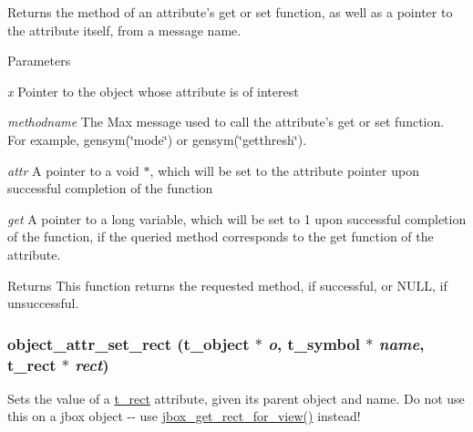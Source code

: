 Returns the method of an attribute's {\ttfamily get} or {\ttfamily set} function, as well as a pointer to the attribute itself, from a message name. 
\begin{DoxyParams}{Parameters}
\item[{\em x}]Pointer to the object whose attribute is of interest \item[{\em methodname}]The Max message used to call the attribute's {\ttfamily get} or {\ttfamily set} function. For example, {\ttfamily gensym(\char`\"{}mode\char`\"{})} or {\ttfamily gensym(\char`\"{}getthresh\char`\"{})}. \item[{\em attr}]A pointer to a void $\ast$, which will be set to the attribute pointer upon successful completion of the function \item[{\em get}]A pointer to a long variable, which will be set to 1 upon successful completion of the function, if the queried method corresponds to the {\ttfamily get} function of the attribute.\end{DoxyParams}
\begin{DoxyReturn}{Returns}
This function returns the requested method, if successful, or NULL, if unsuccessful. 
\end{DoxyReturn}
\hypertarget{group__attr_gade34eaf43b967c3bc401b13317e15df2}{
\subsubsection[{object\_\-attr\_\-set\_\-rect}]{ object\_\-attr\_\-set\_\-rect ({\bf t\_\-object} $\ast$ {\em o}, \/  {\bf t\_\-symbol} $\ast$ {\em name}, \/  {\bf t\_\-rect} $\ast$ {\em rect})}}
\label{group__attr_gade34eaf43b967c3bc401b13317e15df2}


Sets the value of a \hyperlink{structt__rect}{t\_\-rect} attribute, given its parent object and name. Do not use this on a jbox object -\/-\/ use \hyperlink{group__jbox_gab47a7fa918c470f60f0789baafaa7b4b}{jbox\_\-get\_\-rect\_\-for\_\-view()} instead!


